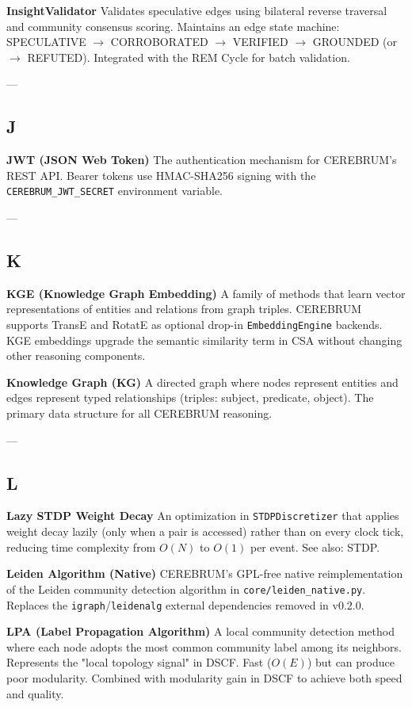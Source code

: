 \documentclass[11pt,article,oneside]{memoir}
\begin{document}
\textbf{InsightValidator}
Validates speculative edges using bilateral reverse traversal and community consensus scoring. Maintains an edge state machine: SPECULATIVE $\to$ CORROBORATED $\to$ VERIFIED $\to$ GROUNDED (or $\to$ REFUTED). Integrated with the REM Cycle for batch validation.

---

\subsection{J}

\textbf{JWT (JSON Web Token)}
The authe\-ntication mechanism for CEREBRUM's REST API. Bearer tokens use HMAC-SHA256 signing with the \texttt{CEREBRUM\_JWT\_SECRET} environment variable.

---

\subsection{K}

\textbf{KGE (Knowledge Graph Embedding)}
A family of methods that learn vector repre\-sentations of entities and relations from graph triples. CEREBRUM supports TransE and RotatE as optional drop-in \texttt{EmbeddingEngine} backends. KGE embeddings upgrade the semantic similarity term in CSA without changing other reasoning components.

\textbf{Knowledge Graph (KG)}
A directed graph where nodes represent entities and edges represent typed relat\-ionships (triples: subject, predicate, object). The primary data structure for all CEREBRUM reasoning.

---

\subsection{L}

\textbf{Lazy STDP Weight Decay}
An optim\-ization in \texttt{STDPDiscretizer} that applies weight decay lazily (only when a pair is accessed) rather than on every clock tick, reducing time complexity from $O(N)$ to $O(1)$ per event. See also: STDP.

\textbf{Leiden Algorithm (Native)}
CEREBRUM's GPL-free native reimp\-lementation of the Leiden community detection algorithm in \texttt{core/leiden\_native.py}. Replaces the \texttt{igraph}/\texttt{leidenalg} external depen\-dencies removed in v0.2.0.

\textbf{LPA (Label Propagation Algorithm)}
A local community detection method where each node adopts the most common community label among its neighbors. Represents the "local topology signal" in DSCF. Fast ($O(E)$) but can produce poor modularity. Combined with modularity gain in DSCF to achieve both speed and quality.
\end{document}
